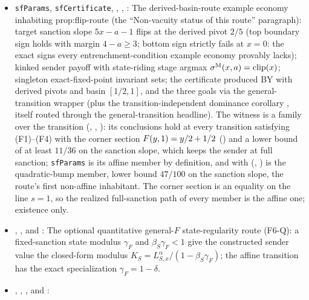 \begin{itemize}[leftmargin=1.4em,itemsep=1pt]
\item \texttt{sfParams}, \texttt{sfCertificate}, , , : The derived-basin-route example economy inhabiting prop:flip-route (the ``Non-vacuity status of this route'' paragraph): target sanction slope $5x-a-1$ flips at the derived pivot $2/5$ (top boundary sign holds with margin $4-a\ge3$; bottom sign strictly fails at $x=0$: the exact signs every entrenchment-condition example economy provably lacks); kinked sender payoff with state-riding stage argmax $\sigma^{\mathrm{M}}(x,a)=\mathrm{clip}(x)$; singleton exact-fixed-point invariant sets; the certificate produced BY  with derived pivots and basin $[1/2,1]$, and the three goals via the general-transition wrapper (plus the transition-independent dominance corollary , itself routed through the general-transition headline). The witness is a family over the transition (, , ): its conclusions hold at every transition satisfying (F1)--(F4) with the corner section $F(y,1)=y/2+1/2$ () and a lower bound of at least $11/36$ on the sanction slope, which keeps the sender at full sanction; \texttt{sfParams} is its affine member by definition, and  with  (, ) is the quadratic-bump member, lower bound $47/100$ on the sanction slope, the route's first non-affine inhabitant. The corner section is an equality on the line $s=1$, so the realized full-sanction path of every member is the affine one; existence only.
\item {},
, and
: The optional quantitative general-$F$ state-regularity route (F6-Q): a fixed-sanction state modulus $\gamma_F$ and $\beta_S\gamma_F<1$ give the constructed sender value the closed-form modulus $K_S=L_{S,x}^{\alpha}/(1-\beta_S\gamma_F)$; the affine transition has the exact specialization $\gamma_F=1-\delta$.
\item
{},
,
,
and
:

\end{itemize}
